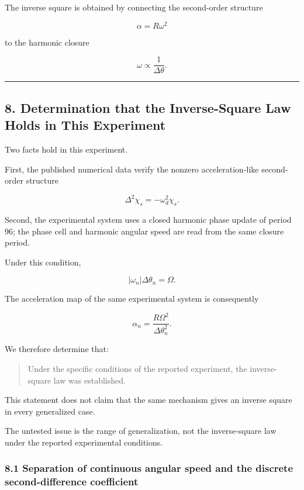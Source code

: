 \documentclass[
  a4paper,
]{article}
\begin{document}
The inverse square is obtained by connecting the second-order structure

\[
\alpha=R\omega^2
\]

to the harmonic closure

\[
\omega\propto\frac{1}{\Delta\theta}.
\]

\begin{center}\rule{0.5\linewidth}{0.5pt}\end{center}

\subsection{8. Determination that the Inverse-Square Law Holds in This
Experiment}\label{determination-that-the-inverse-square-law-holds-in-this-experiment}

Two facts hold in this experiment.

First, the published numerical data verify the nonzero acceleration-like
second-order structure

\[
\Delta^2\chi_s
=-\omega_d^2\chi_s.
\]

Second, the experimental system uses a closed harmonic phase update of
period 96; the phase cell and harmonic angular speed are read from the
same closure period.

Under this condition,

\[
|\omega_n|\Delta\theta_n=\Omega.
\]

The acceleration map of the same experimental system is consequently

\[
\alpha_n
=\frac{R\Omega^2}{\Delta\theta_n^2}.
\]

We therefore determine that:

\begin{quote}
Under the specific conditions of the reported experiment, the
inverse-square law was established.
\end{quote}

This statement does not claim that the same mechanism gives an inverse
square in every generalized case.

The untested issue is the range of generalization, not the
inverse-square law under the reported experimental conditions.

\subsubsection{8.1 Separation of continuous angular speed and the
discrete second-difference
coefficient}\label{separation-of-continuous-angular-speed-and-the-discrete-second-difference-coefficient}
\end{document}
